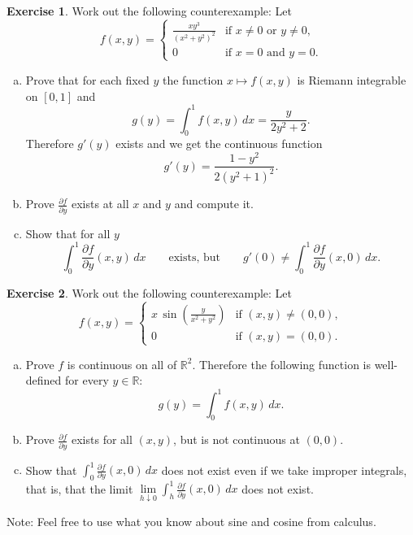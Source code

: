 \documentclass[12pt,openany]{book}
\newcommand{\R}{{\mathbb{R}}}
\theoremstyle{plain}
\theoremstyle{remark}
\theoremstyle{definition}
\newenvironment{exbox}{%
    \def\FrameCommand{\vrule width 1pt \relax\hspace{10pt}}%
    \MakeFramed{\advance\hsize-\width\FrameRestore}%
}{%
    \endMakeFramed
}
\newenvironment{exparts}{%
    \leavevmode\begin{enumerate}[a),noitemsep,topsep=0pt,parsep=0pt,partopsep=0pt]
}{%
    \end{enumerate}
}
\theoremstyle{exercise}
\newtheorem{exercise}{Exercise}[section]
\theoremstyle{example}
\begin{document}
\begin{exbox}
\begin{exercise}
\pagebreak[2]
Work out the following counterexample:  Let
\begin{equation*}
f(x,y) =
\begin{cases}
\frac{xy^3}{{(x^2+y^2)}^2} & \text{if } x \neq 0 \text{ or  } y \neq 0,\\
0 & \text{if } x=0 \text{ and } y=0.
\end{cases}
\end{equation*}
\begin{exparts}
\item
Prove that for each fixed $y$ the function $x \mapsto f(x,y)$ is
Riemann integrable on $[0,1]$ and
\begin{equation*}
g(y) = \int_0^1 f(x,y) \, dx = \frac{y}{2y^2+2} .
\end{equation*}
Therefore $g'(y)$ exists and we get the continuous function
\begin{equation*}
g'(y) = \frac{1-y^2}{2{(y^2+1)}^2} .
\end{equation*}
\item
Prove $\frac{\partial f}{\partial y}$ exists at all $x$ and $y$ and
compute it.
\item
Show that for all $y$
\begin{equation*}
\int_0^1 \frac{\partial f}{\partial y} (x,y) \, dx
\qquad
\text{exists, but}
\qquad
g'(0) \neq \int_0^1 \frac{\partial f}{\partial y} (x,0) \, dx .
\end{equation*}
\end{exparts}
\end{exercise}

\begin{exercise}
Work out the following counterexample:  Let
\begin{equation*}
f(x,y) =
\begin{cases}
x \,\sin \left(\frac{y}{x^2+y^2}\right) & \text{if } (x,y) \neq (0,0),\\
0 & \text{if } (x,y)=(0,0).
\end{cases}
\end{equation*}
\begin{exparts}
\item
Prove $f$ is continuous on all of $\R^2$.
Therefore the following function is well-defined for every $y \in \R$:
\begin{equation*}
g(y) = \int_0^1 f(x,y) \, dx .
\end{equation*}
\item
Prove $\frac{\partial f}{\partial y}$ exists for all $(x,y)$,
but is not continuous at $(0,0)$.
\item
Show that $\int_0^1 \frac{\partial f}{\partial y}(x,0) \, dx$ does not
exist even if we take improper integrals, that is,
that the limit
$\lim\limits_{h \downarrow 0} \int_h^1 \frac{\partial f}{\partial y}(x,0) \, dx$
does not exist.
\end{exparts}
Note: Feel free to use what you know about sine and cosine from calculus.
\pagebreak[2]
\end{exercise}


\end{exbox}
\end{document}
